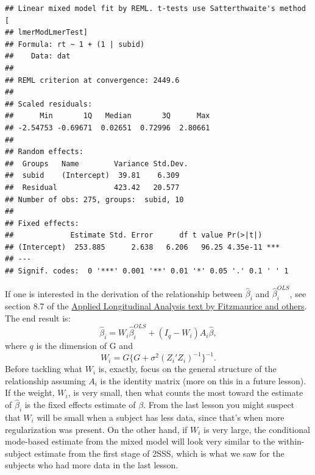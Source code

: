 \documentclass[
]{book}
\newenvironment{Shaded}{\begin{snugshade}}{\end{snugshade}}
\newcommand{\CommentTok}[1]{\textcolor[rgb]{0.56,0.35,0.01}{\textit{#1}}}
\newcommand{\DecValTok}[1]{\textcolor[rgb]{0.00,0.00,0.81}{#1}}
\newcommand{\KeywordTok}[1]{\textcolor[rgb]{0.13,0.29,0.53}{\textbf{#1}}}
\newcommand{\NormalTok}[1]{#1}
\newcommand{\OperatorTok}[1]{\textcolor[rgb]{0.81,0.36,0.00}{\textbf{#1}}}
\newcommand{\StringTok}[1]{\textcolor[rgb]{0.31,0.60,0.02}{#1}}
\begin{document}
\begin{verbatim}
## Linear mixed model fit by REML. t-tests use Satterthwaite's method [
## lmerModLmerTest]
## Formula: rt ~ 1 + (1 | subid)
##    Data: dat
## 
## REML criterion at convergence: 2449.6
## 
## Scaled residuals: 
##      Min       1Q   Median       3Q      Max 
## -2.54753 -0.69671  0.02651  0.72996  2.80661 
## 
## Random effects:
##  Groups   Name        Variance Std.Dev.
##  subid    (Intercept)  39.81    6.309  
##  Residual             423.42   20.577  
## Number of obs: 275, groups:  subid, 10
## 
## Fixed effects:
##             Estimate Std. Error      df t value Pr(>|t|)    
## (Intercept)  253.885      2.638   6.206   96.25 4.35e-11 ***
## ---
## Signif. codes:  0 '***' 0.001 '**' 0.01 '*' 0.05 '.' 0.1 ' ' 1
\end{verbatim}

\begin{Shaded}
\end{Shaded}

If one is interested in the derivation of the relationship between \(\hat\beta_i\) and \(\hat\beta_i^{OLS}\), see section 8.7 of the \href{https://www.amazon.com/Applied-Longitudinal-Analysis-Garrett-Fitzmaurice/dp/0470380276}{Applied Longitudinal Analysis text by Fitzmaurice and others}. The end result is: \[\hat\beta_i = W_i\hat\beta_i^{OLS}+(I_q-W_i)A_i\hat\beta,\]
where \(q\) is the dimension of G and \[W_i= G\{G+\sigma^2(Z_i'Z_i)^{-1}\}^{-1}.\]
Before tackling what \(W_i\) is, exactly, focus on the general structure of the relationship assuming \(A_i\) is the identity matrix (more on this in a future lesson). If the weight, \(W_i\), is very small, then what counts the most toward the estimate of \(\hat\beta_i\) is the fixed effects estimate of \(\beta\). From the last lesson you might suspect that \(W_i\) will be small when a subject has less data, since that's when more regularization was present. On the other hand, if \(W_i\) is very large, the conditional mode-based estimate from the mixed model will look very similar to the within-subject estimate from the first stage of 2SSS, which is what we saw for the subjects who had more data in the last lesson.
\end{document}
